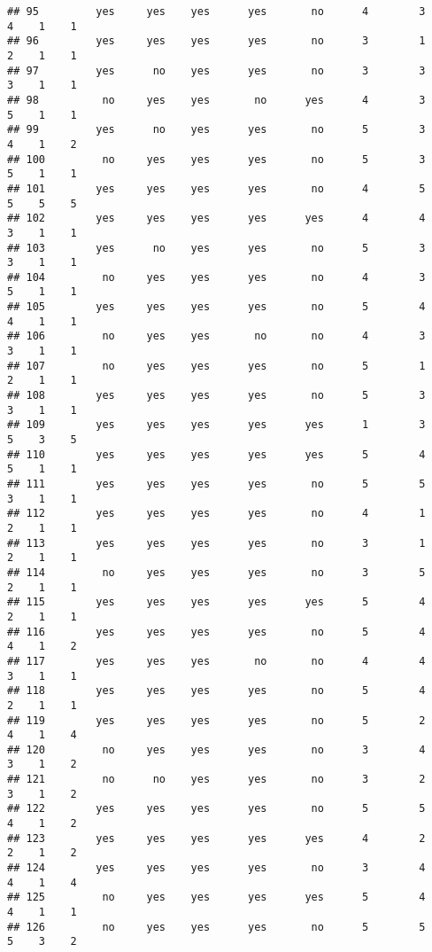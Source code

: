 \documentclass[
]{article}
\begin{document}
\begin{verbatim}
## 95         yes     yes    yes      yes       no      4        3     4    1    1
## 96         yes     yes    yes      yes       no      3        1     2    1    1
## 97         yes      no    yes      yes       no      3        3     3    1    1
## 98          no     yes    yes       no      yes      4        3     5    1    1
## 99         yes      no    yes      yes       no      5        3     4    1    2
## 100         no     yes    yes      yes       no      5        3     5    1    1
## 101        yes     yes    yes      yes       no      4        5     5    5    5
## 102        yes     yes    yes      yes      yes      4        4     3    1    1
## 103        yes      no    yes      yes       no      5        3     3    1    1
## 104         no     yes    yes      yes       no      4        3     5    1    1
## 105        yes     yes    yes      yes       no      5        4     4    1    1
## 106         no     yes    yes       no       no      4        3     3    1    1
## 107         no     yes    yes      yes       no      5        1     2    1    1
## 108        yes     yes    yes      yes       no      5        3     3    1    1
## 109        yes     yes    yes      yes      yes      1        3     5    3    5
## 110        yes     yes    yes      yes      yes      5        4     5    1    1
## 111        yes     yes    yes      yes       no      5        5     3    1    1
## 112        yes     yes    yes      yes       no      4        1     2    1    1
## 113        yes     yes    yes      yes       no      3        1     2    1    1
## 114         no     yes    yes      yes       no      3        5     2    1    1
## 115        yes     yes    yes      yes      yes      5        4     2    1    1
## 116        yes     yes    yes      yes       no      5        4     4    1    2
## 117        yes     yes    yes       no       no      4        4     3    1    1
## 118        yes     yes    yes      yes       no      5        4     2    1    1
## 119        yes     yes    yes      yes       no      5        2     4    1    4
## 120         no     yes    yes      yes       no      3        4     3    1    2
## 121         no      no    yes      yes       no      3        2     3    1    2
## 122        yes     yes    yes      yes       no      5        5     4    1    2
## 123        yes     yes    yes      yes      yes      4        2     2    1    2
## 124        yes     yes    yes      yes       no      3        4     4    1    4
## 125         no     yes    yes      yes      yes      5        4     4    1    1
## 126         no     yes    yes      yes       no      5        5     5    3    2

\end{verbatim}
\end{document}
